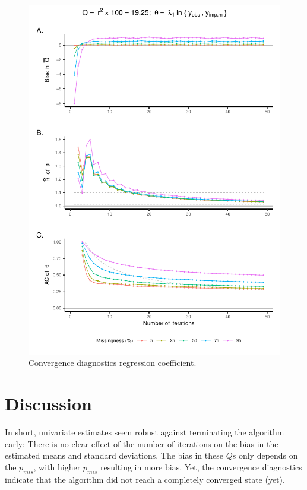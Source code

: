 \documentclass[Royal,times,sageh]{sagej}
\begin{document}
\begin{figure}

{\centering \includegraphics{manuscript_files/figure-latex/pred-1} 

}

\caption{Convergence diagnostics regression coefficient.}\label{fig:pred}
\end{figure}

\hypertarget{discussion}{%
\section{Discussion}\label{discussion}}

In short, univariate estimates seem robust against terminating the algorithm early: There is no clear effect of the number of iterations on the bias in the estimated means and standard deviations. The bias in these \(Q\)s only depends on the \(p_{mis}\), with higher \(p_{mis}\) resulting in more bias. Yet, the convergence diagnostics indicate that the algorithm did not reach a completely converged state (yet).
\end{document}
